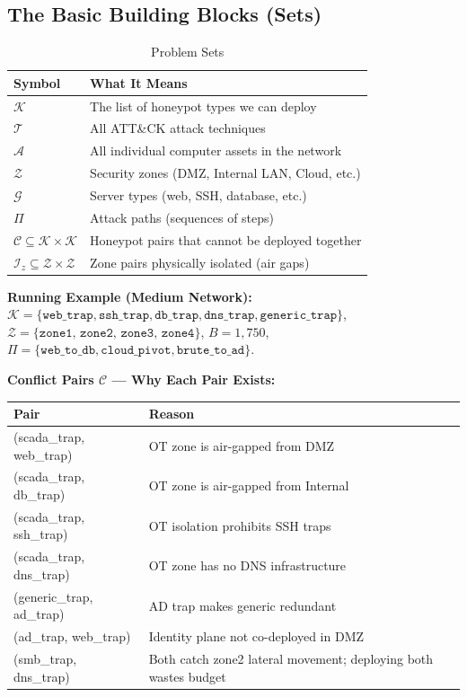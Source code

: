 \documentclass[journal]{IEEEtran}
\newcommand{\calK}{\mathcal{K}}
\newcommand{\calT}{\mathcal{T}}
\newcommand{\calA}{\mathcal{A}}
\newcommand{\calZ}{\mathcal{Z}}
\newcommand{\calG}{\mathcal{G}}
\newcommand{\calC}{\mathcal{C}}
\newcommand{\calPi}{\mathcal{\Pi}}
\begin{document}
\subsection{The Basic Building Blocks (Sets)}

\begin{table}[htbp]
\caption{Problem Sets}
\label{tab:sets}
\centering
\renewcommand{\arraystretch}{1.2}
\begin{tabular}{@{}ll@{}}
\toprule
\textbf{Symbol} & \textbf{What It Means} \\
\midrule
$\calK$ & The list of honeypot types we can deploy \\
$\calT$ & All ATT\&CK attack techniques \\
$\calA$ & All individual computer assets in the network \\
$\calZ$ & Security zones (DMZ, Internal LAN, Cloud, etc.) \\
$\calG$ & Server types (web, SSH, database, etc.) \\
$\calPi$ & Attack paths (sequences of steps) \\
$\calC \subseteq \calK \times \calK$ &
  Honeypot pairs that cannot be deployed together \\
$\mathcal{I}_z \subseteq \calZ \times \calZ$ &
  Zone pairs physically isolated (air gaps) \\
\bottomrule
\end{tabular}
\end{table}

\begin{examplebox}
\textbf{Running Example (Medium Network):}
$\calK = \{\texttt{web\_trap}, \texttt{ssh\_trap},
\texttt{db\_trap}, \texttt{dns\_trap},
\texttt{generic\_trap}\}$,
$\calZ = \{\texttt{zone1, zone2, zone3, zone4}\}$,
$B = 1{,}750$,
$\calPi = \{\texttt{web\_to\_db}, \texttt{cloud\_pivot},
\texttt{brute\_to\_ad}\}$.
\end{examplebox}

\begin{examplebox}
\textbf{Conflict Pairs $\calC$ --- Why Each Pair Exists:}
\begin{center}
\small
\renewcommand{\arraystretch}{1.1}
\begin{tabular}{@{}ll@{}}
\toprule
\textbf{Pair} & \textbf{Reason} \\
\midrule
(scada\_trap, web\_trap)  & OT zone is air-gapped from DMZ \\
(scada\_trap, db\_trap)   & OT zone is air-gapped from Internal \\
(scada\_trap, ssh\_trap)  & OT isolation prohibits SSH traps \\
(scada\_trap, dns\_trap)  & OT zone has no DNS infrastructure \\
(generic\_trap, ad\_trap) & AD trap makes generic redundant \\
(ad\_trap, web\_trap)     & Identity plane not co-deployed in DMZ \\
(smb\_trap, dns\_trap)    & Both catch zone2 lateral movement;
                            deploying both wastes budget \\
\bottomrule
\end{tabular}
\end{center}
\end{examplebox}
\end{document}
